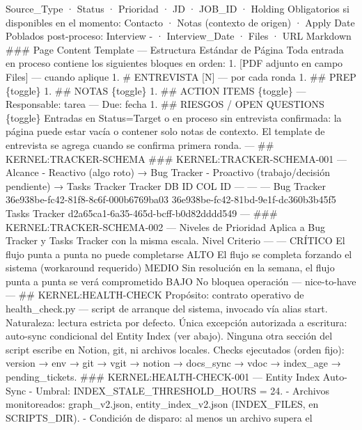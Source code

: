 \documentclass[
]{article}
\begin{document}
Source\_Type · Status · Prioridad · JD · JOB\_ID · Holding Obligatorios
si disponibles en el momento: Contacto · Notas (contexto de origen) ·
Apply Date Poblados post-proceso: Interview - · Interview\_Date · Files
· URL Markdown \#\#\# Page Content Template --- Estructura Estándar de
Página Toda entrada en proceso contiene los siguientes bloques en orden:
1. {[}PDF adjunto en campo Files{]} --- cuando aplique 1. \# ENTREVISTA
{[}N{]} --- por cada ronda 1. \#\# PREP \{toggle\} 1. \#\# NOTAS
\{toggle\} 1. \#\# ACTION ITEMS \{toggle\} --- Responsable: tarea ---
Due: fecha 1. \#\# RIESGOS / OPEN QUESTIONS \{toggle\} Entradas en
Status=Target o en proceso sin entrevista confirmada: la página puede
estar vacía o contener solo notas de contexto. El template de entrevista
se agrega cuando se confirma primera ronda. --- \#\#
KERNEL:TRACKER-SCHEMA \#\#\# KERNEL:TRACKER-SCHEMA-001 --- Alcance -
Reactivo (algo roto) → Bug Tracker - Proactivo (trabajo/decisión
pendiente) → Tasks Tracker \textbar{} Tracker \textbar{} DB ID
\textbar{} COL ID \textbar{} \textbar{} --- \textbar{} --- \textbar{}
--- \textbar{} \textbar{} Bug Tracker \textbar{}
36e938be-fc42-81f8-8c6f-000b6769ba03 \textbar{}
36e938be-fc42-81bd-9e1f-dc360b3b45f5 \textbar{} \textbar{} Tasks Tracker
\textbar{} d2a65ca1-6a35-465d-bcff-b0d82dddd549 \textbar{} ---
\textbar{} \#\#\# KERNEL:TRACKER-SCHEMA-002 --- Niveles de Prioridad
Aplica a Bug Tracker y Tasks Tracker con la misma escala. \textbar{}
Nivel \textbar{} Criterio \textbar{} \textbar{} --- \textbar{} ---
\textbar{} \textbar{} CRÍTICO \textbar{} El flujo punta a punta no puede
completarse \textbar{} \textbar{} ALTO \textbar{} El flujo se completa
forzando el sistema (workaround requerido) \textbar{} \textbar{} MEDIO
\textbar{} Sin resolución en la semana, el flujo punta a punta se verá
comprometido \textbar{} \textbar{} BAJO \textbar{} No bloquea operación
--- nice-to-have \textbar{} --- \#\# KERNEL:HEALTH-CHECK Propósito:
contrato operativo de health\_check.py --- script de arranque del
sistema, invocado vía alias start. Naturaleza: lectura estricta por
defecto. Única excepción autorizada a escritura: auto-sync condicional
del Entity Index (ver abajo). Ninguna otra sección del script escribe en
Notion, git, ni archivos locales. Checks ejecutados (orden fijo):
version → env → git → vgit → notion → docs\_sync → vdoc → index\_age →
pending\_tickets. \#\#\# KERNEL:HEALTH-CHECK-001 --- Entity Index
Auto-Sync - Umbral: INDEX\_STALE\_THRESHOLD\_HOURS = 24. - Archivos
monitoreados: graph\_v2.json, entity\_index\_v2.json (INDEX\_FILES, en
SCRIPTS\_DIR). - Condición de disparo: al menos un archivo supera el
\end{document}
